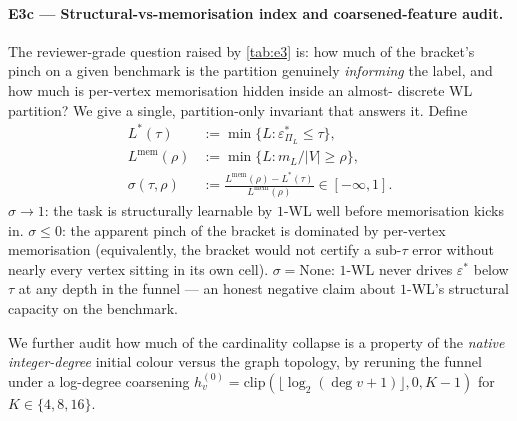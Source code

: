 \documentclass[10pt]{article}
\theoremstyle{definition}
\theoremstyle{remark}
\newcommand{\eps}{\varepsilon}
\begin{document}
\paragraph{E3c --- Structural-vs-memorisation index and
coarsened-feature audit.} The reviewer-grade question raised by
\cref{tab:e3} is: how much of the bracket's pinch on a given
benchmark is the partition genuinely \emph{informing} the label,
and how much is per-vertex memorisation hidden inside an almost-
discrete WL partition? We give a single, partition-only invariant
that answers it. Define
\begin{align*}
  L^{*}(\tau)         &:= \min\{L : \eps^{*}_{\Pi_{L}} \le \tau\}, \\
  L^{\mathrm{mem}}(\rho) &:= \min\{L : m_{L}/|V| \ge \rho\}, \\
  \sigma(\tau, \rho)  &:= \frac{L^{\mathrm{mem}}(\rho) - L^{*}(\tau)}
                              {L^{\mathrm{mem}}(\rho)} \in [-\infty, 1].
\end{align*}
$\sigma \to 1$: the task is structurally learnable by $1$-WL well
before memorisation kicks in. $\sigma \le 0$: the apparent pinch
of the bracket is dominated by per-vertex memorisation
(equivalently, the bracket would not certify a sub-$\tau$ error
without nearly every vertex sitting in its own cell).
$\sigma = \mathrm{None}$: $1$-WL never drives $\eps^{*}$ below
$\tau$ at any depth in the funnel --- an honest negative claim
about $1$-WL's structural capacity on the benchmark.

We further audit how much of the cardinality collapse is a
property of the \emph{native integer-degree} initial colour
versus the graph topology, by reruning the funnel under a
log-degree coarsening $h^{(0)}_v = \mathrm{clip}(\lfloor
\log_{2}(\deg v + 1)\rfloor, 0, K-1)$ for $K \in \{4, 8, 16\}$.
\end{document}

